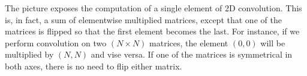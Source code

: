 
The picture exposes the computation of a single element of 2D convolution. 
This is, in fact, a sum of elementwise multiplied matrices, except that one of the matrices is 
flipped so that the first element becomes the last. For instance, if we perform convolution on two 
$(N \times N)$ matrices, the element $(0, 0)$ will be multiplied by $(N, N)$ and vise versa. 
If one of the matrices is symmetrical in both axes, there is no need to flip either matrix.
